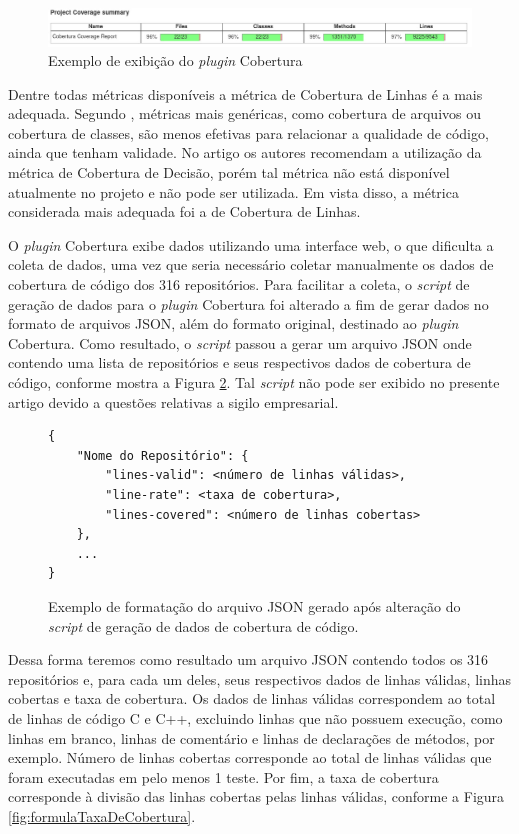 \documentclass[11.5pt]{article}
\begin{document}
\begin{figure}[ht]
    \centering
    \includegraphics[width=1.0\textwidth]{cobertura.jpeg}
    \caption{Exemplo de exibição do \textit{plugin} Cobertura}
    \label{fig:pluginCobertura}
\end{figure}

Dentre todas métricas disponíveis a métrica de Cobertura de Linhas é a mais adequada.
Segundo \cite{coverageMetaAnalysis}, métricas mais genéricas, como cobertura de arquivos ou
cobertura de classes, são menos efetivas para relacionar a qualidade de código, ainda que tenham
validade.
No artigo os autores recomendam a utilização da métrica de Cobertura de Decisão, porém tal métrica
não está disponível atualmente no projeto e não pode ser utilizada.
Em vista disso, a métrica considerada mais adequada foi a de Cobertura de Linhas.

O \textit{plugin} Cobertura exibe dados utilizando uma interface web, o que dificulta a coleta de
dados, uma vez que seria necessário coletar manualmente os dados de cobertura de código dos 316
repositórios.
Para facilitar a coleta, o \textit{script} de geração de dados para o \textit{plugin} Cobertura
foi alterado a fim de gerar dados no formato de arquivos JSON, além do formato original, destinado
ao \textit{plugin} Cobertura.
Como resultado, o \textit{script} passou a gerar um arquivo JSON onde contendo uma lista de
repositórios e seus respectivos dados de cobertura de código, conforme mostra a Figura
\ref{fig:formatoJsonCoverage}.
Tal \textit{script} não pode ser exibido no presente artigo devido a questões relativas a sigilo
empresarial.

\begin{figure}[ht]
\caption{Exemplo de formatação do arquivo JSON gerado após alteração do \textit{script} de
geração de dados de cobertura de código.}
\label{fig:formatoJsonCoverage}
\begin{verbatim}
{
    "Nome do Repositório": {
        "lines-valid": <número de linhas válidas>,
        "line-rate": <taxa de cobertura>,
        "lines-covered": <número de linhas cobertas>
    },
    ...
}
\end{verbatim}
\end{figure}

Dessa forma teremos como resultado um arquivo JSON contendo todos os 316 repositórios e, para cada
um deles, seus respectivos dados de linhas válidas, linhas cobertas e taxa de cobertura.
Os dados de linhas válidas correspondem ao total de linhas de código C e C++, excluindo linhas que
não possuem execução, como linhas em branco, linhas de comentário e linhas de declarações de
métodos, por exemplo. Número de linhas cobertas corresponde ao total de linhas válidas que foram
executadas em pelo menos 1 teste. Por fim, a taxa de cobertura corresponde à divisão das linhas
cobertas pelas linhas válidas, conforme a Figura \ref{fig:formulaTaxaDeCobertura}.
\end{document}
